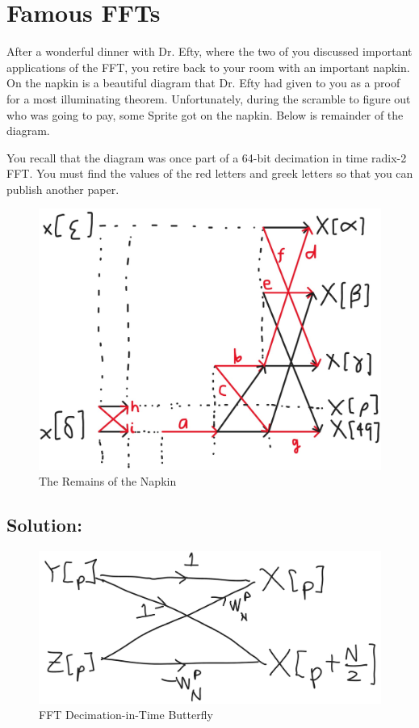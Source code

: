 \documentclass{article}
\begin{document}
\newpage

\section{Famous FFTs}

After a wonderful dinner with Dr. Efty, where the two of you discussed important applications of the FFT, you retire back to your room with an important napkin. On the napkin is a beautiful diagram that Dr. Efty had given to you as a proof for a most illuminating theorem. Unfortunately, during the scramble to figure out who was going to pay, some Sprite got on the napkin. Below is remainder of the diagram.

You recall that the diagram was once part of a 64-bit decimation in time radix-2 FFT. You must find the values of the red letters and greek letters so that you can publish another paper.

\begin{figure}[h!]
\begin{center}
    \includegraphics[width=0.8 \textwidth]{figures/FFT Diagram.jpg}
    \caption{The Remains of the Napkin}
    \label{fig:FFT_diagram}
\end{center}
\end{figure}

\subsection{Solution:}

\begin{figure}[h!]
\begin{center}
    \includegraphics[width=0.5 \textwidth]{figures/FFT Butterfly.jpg}
    \caption{FFT Decimation-in-Time Butterfly}
    \label{fig:FFT Butterfly}
\end{center}
\end{figure}
\end{document}
